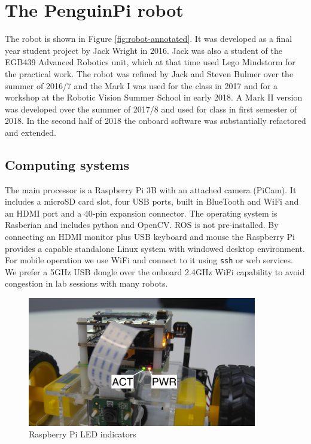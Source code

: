 \documentclass[11pt,fleqn]{article}
\begin{document}
\section{The PenguinPi robot}
The robot is shown in Figure \ref{fig:robot-annotated}.
It was developed as a final year student project by Jack Wright in 2016.
Jack was also a student of the EGB439 Advanced Robotics
unit, which at that time used Lego Mindstorm for the practical work.
The robot was refined by Jack and Steven Bulmer over the summer of 2016/7 and the Mark I was used for
the class in 2017 and for a workshop at the Robotic Vision Summer School in early 2018.
A Mark II version was developed over the summer of 2017/8 and used for  class in first semester of 2018.
In the second half of 2018 the onboard software was substantially refactored and extended.


\subsection{Computing systems}
The main processor is a Raspberry Pi 3B with an attached camera (PiCam). 
It includes a microSD card slot, four USB ports, built in BlueTooth and WiFi and an HDMI port and a 40-pin expansion connector.
The operating system is Rasberian and includes python and OpenCV.  ROS is not pre-installed.
By connecting an HDMI monitor plus USB keyboard and mouse the Raspberry Pi provides a capable standalone Linux system with windowed desktop environment.
For mobile operation we use WiFi and connect to it using \texttt{ssh} or web services.
We prefer a 5\unit{GHz} USB dongle over the onboard 2.4\unit{GHz} WiFi capability to avoid congestion in lab sessions with many 
robots.

\begin{figure}
\centering
\includegraphics[width=10cm]{P1080367.JPG}
\caption{Raspberry Pi LED indicators}\label{fig:pi-leds}
\end{figure}
\end{document}
